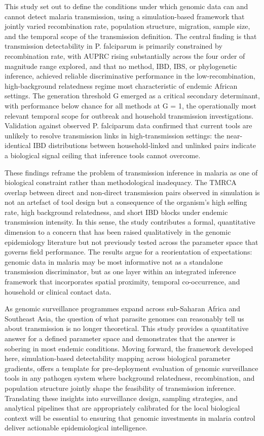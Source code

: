 \documentclass[
  11pt,
]{article}
\begin{document}
This study set out to define the conditions under which genomic data can
and cannot detect malaria transmission, using a simulation-based
framework that jointly varied recombination rate, population structure,
migration, sample size, and the temporal scope of the transmission
definition. The central finding is that transmission detectability in P.
falciparum is primarily constrained by recombination rate, with AUPRC
rising substantially across the four order of magnitude range explored,
and that no method, IBD, IBS, or phylogenetic inference, achieved
reliable discriminative performance in the low-recombination,
high-background relatedness regime most characteristic of endemic
African settings. The generation threshold G emerged as a critical
secondary determinant, with performance below chance for all methods at
G = 1, the operationally most relevant temporal scope for outbreak and
household transmission investigations. Validation against observed P.
falciparum data confirmed that current tools are unlikely to resolve
transmission links in high-transmission settings: the near-identical IBD
distributions between household-linked and unlinked pairs indicate a
biological signal ceiling that inference tools cannot overcome.

These findings reframe the problem of transmission inference in malaria
as one of biological constraint rather than methodological inadequacy.
The TMRCA overlap between direct and non-direct transmission pairs
observed in simulation is not an artefact of tool design but a
consequence of the organism's high selfing rate, high background
relatedness, and short IBD blocks under endemic transmission intensity.
In this sense, the study contributes a formal, quantitative dimension to
a concern that has been raised qualitatively in the genomic epidemiology
literature but not previously tested across the parameter space that
governs field performance. The results argue for a reorientation of
expectations: genomic data in malaria may be most informative not as a
standalone transmission discriminator, but as one layer within an
integrated inference framework that incorporates spatial proximity,
temporal co-occurrence, and household or clinical contact data.

As genomic surveillance programmes expand across sub-Saharan Africa and
Southeast Asia, the question of what parasite genomes can reasonably
tell us about transmission is no longer theoretical. This study provides
a quantitative answer for a defined parameter space and demonstrates
that the answer is sobering in most endemic conditions. Moving forward,
the framework developed here, simulation-based detectability mapping
across biological parameter gradients, offers a template for
pre-deployment evaluation of genomic surveillance tools in any pathogen
system where background relatedness, recombination, and population
structure jointly shape the feasibility of transmission inference.
Translating these insights into surveillance design, sampling
strategies, and analytical pipelines that are appropriately calibrated
for the local biological context will be essential to ensuring that
genomic investments in malaria control deliver actionable
epidemiological intelligence.
\end{document}
